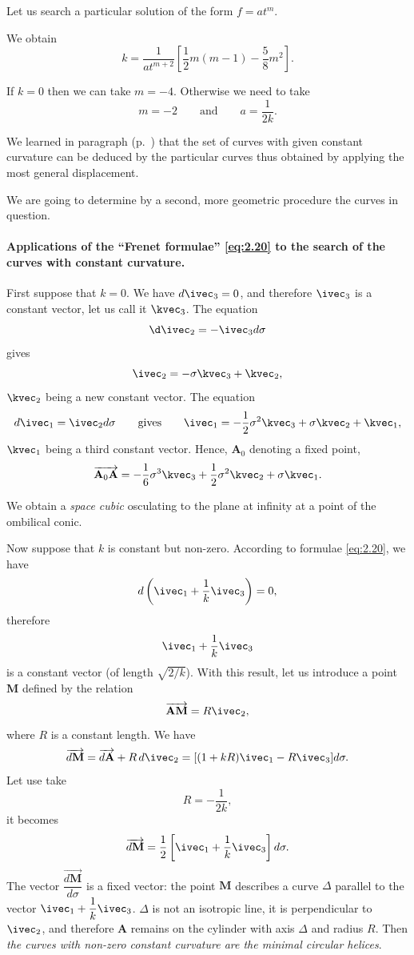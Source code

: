 Let us search a particular solution of the form $f=at^{m}$.

We obtain
\[
k=\frac{1}{at^{m+2}}\left[\frac{1}{2}m(m-1)-\frac{5}{8}m^{2}\right].
\]

If $k=0$ then we can take $m=-4$. Otherwise we need to take
\[
m=-2\qquad\text{and}\qquad a=\frac{1}{2k}.
\]

We learned in paragraph  (p.~\pageref{sec:31}) that the set of curves with given constant curvature can be deduced by the particular curves thus obtained by applying the most general displacement.

We are going to determine by a second, more geometric procedure the curves in question.

\paragraph{Applications of the ``Frenet formulae'' \eqref{eq:2.20} to the search of the curves with constant curvature.}
\label{sec:37}
First suppose that $k=0$. We have $d\ivec_{3}=0$, and therefore $\ivec_{3}$ is a constant vector, let us call it $\kvec_{3}$. The equation
\[
\d\ivec_{2}=-\ivec_{3}d\sigma
\]
gives
\[
\ivec_{2}=-\sigma\kvec_{3}+\kvec_{2},
\]
$\kvec_{2}$ being a new constant vector. The equation
\[
d\ivec_{1}=\ivec_{2}d\sigma\qquad\text{gives}\qquad\ivec_{1}=-\frac{1}{2}\sigma^{2}\kvec_{3}+\sigma\kvec_{2}+\kvec_{1},
\]
$\kvec_{1}$ being a third constant vector. Hence, $\mathbf{A}_{0}$ denoting a fixed point,
\[
\overrightarrow{\mathbf{A}_{0}\mathbf{A}}=-\frac{1}{6}\sigma^{3}\kvec_{3}+\frac{1}{2}\sigma^{2}\kvec_{2}+\sigma\kvec_{1}.
\]

We obtain a \emph{space cubic} osculating to the plane at infinity at a point of the ombilical conic.

Now suppose that $k$ is constant but non-zero. According to formulae \eqref{eq:2.20}, we have
\[
d\left(\ivec_{1}+\frac{1}{k}\ivec_{3}\right)=0,
\]
therefore
\[
\ivec_{1}+\frac{1}{k}\ivec_{3}
\]
is a constant vector (of length $\sqrt{2/k}$). With this result, let us introduce a point $\mathbf{M}$ defined by the relation
\[
\overrightarrow{\mathbf{AM}}=R\ivec_{2},
\]
where $R$ is a constant length. We have
\[
\overrightarrow{d\mathbf{M}}=\overrightarrow{d\mathbf{A}}+R\,d\ivec_{2}=[(1+kR)\ivec_{1}-R\ivec_{3}]d\sigma.
\]
Let use take
\[
R=-\frac{1}{2k},
\]
it becomes
\[
\overrightarrow{d\mathbf{M}}=\frac{1}{2}\left[\ivec_{1}+\frac{1}{k}\ivec_{3}\right]d\sigma.
\]
The vector $\dfrac{\overrightarrow{d\mathbf{M}}}{d\sigma}$ is a fixed vector: the point $\mathbf{M}$ describes a curve $\Delta$ parallel to the vector $\ivec_{1}+\dfrac{1}{k}\ivec_{3}$. $\Delta$ is not an isotropic line, it is perpendicular to $\ivec_{2}$, and therefore $\mathbf{A}$ remains on the cylinder with axis $\Delta$ and radius $R$. Then \emph{the curves with non-zero constant curvature are the minimal circular helices}.

